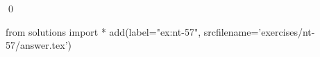 
\begin{ex} 
  \label{ex:nt-57}
  
  \qed
\end{ex} 
\begin{python0}
from solutions import *
add(label="ex:nt-57",
    srcfilename='exercises/nt-57/answer.tex') 
\end{python0}
